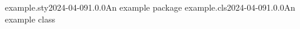 \ProvidesExplPackage
  {example.sty}{2024-04-09}{1.0.0}{An example package}
\ExplSyntaxOff
\ProvidesExplClass  %
  {example.cls}{2024-04-09}{1.0.0}{An example class}
